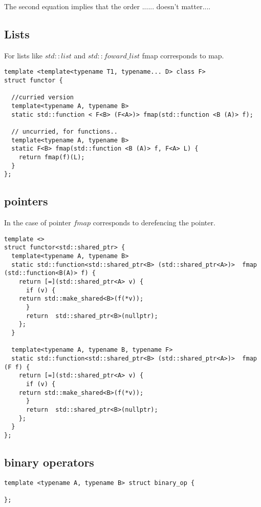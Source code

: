 \documentclass[12pt,fleqn]{article}
\begin{document}
The second equation implies that the order ...... doesn't matter....

\subsection*{Lists}
For lists like $std::list$ and $std::foward\_list$ fmap corresponds to map.
\begin{lstlisting}[caption=fmap, label=listing_fmap ]
template <template<typename T1, typename... D> class F>
struct functor {

  //curried version
  template<typename A, typename B>
  static std::function < F<B> (F<A>)> fmap(std::function <B (A)> f);

  // uncurried, for functions..
  template<typename A, typename B>
  static F<B> fmap(std::function <B (A)> f, F<A> L) {
    return fmap(f)(L);
  }
};
\end{lstlisting}


\subsection*{pointers}

In the case of pointer $fmap$ corresponds to derefencing the pointer.

\begin{lstlisting}
template <>
struct functor<std::shared_ptr> {
  template<typename A, typename B>
  static std::function<std::shared_ptr<B> (std::shared_ptr<A>)>  fmap (std::function<B(A)> f) {
    return [=](std::shared_ptr<A> v) {
      if (v) {
	return std::make_shared<B>(f(*v)); 
      }
      return  std::shared_ptr<B>(nullptr);
    };
  }

  template<typename A, typename B, typename F>
  static std::function<std::shared_ptr<B> (std::shared_ptr<A>)>  fmap (F f) {
    return [=](std::shared_ptr<A> v) {
      if (v) {
	return std::make_shared<B>(f(*v)); 
      }
      return  std::shared_ptr<B>(nullptr);
    };
  }
};
\end{lstlisting}



\subsection*{binary operators}

\begin{lstlisting}[caption=binary operator, label=binop]
template <typename A, typename B> struct binary_op {
  
};

\end{lstlisting}
\end{document}
